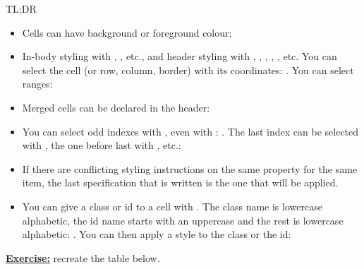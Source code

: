 \begin{infobox}{TL;DR}
\begin{itemize}
	\item Cells can have background or foreground colour: 
	\item In-body styling with , , etc., and header styling with , , , , , etc. You can select the cell (or row, column, border) with its coordinates: . You can select ranges: 
	\item Merged cells can be declared in the header: 
	\item You can select odd indexes with , even with : . The last index can be selected with , the one before last with , etc.: 
	\item If there are conflicting styling instructions on the same property for the same item, the last specification that is written is the one that will be applied.
	\item You can give a class or id to a cell with . The class name is lowercase alphabetic, the id name starts with an uppercase and the rest is lowercase alphabetic: . You can then apply a style to the class or the id: 
\end{itemize}

\textbf{\underline{Exercise:}} recreate the table below.


\end{infobox}
